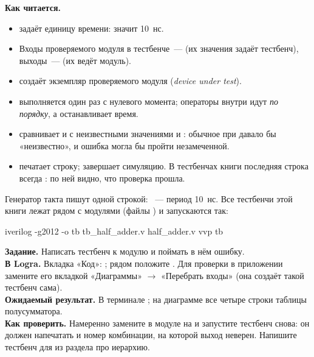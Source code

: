 \textbf{Как читается.}
\begin{itemize}
  \item {} задаёт единицу времени:  значит 10~нс.
  \item Входы проверяемого модуля в тестбенче~---  (их значения
        задаёт тестбенч), выходы~---  (их ведёт модуль).
  \item {} создаёт экземпляр проверяемого модуля
        (\emph{device under test}).
  \item {} выполняется один раз с нулевого
        момента; операторы внутри идут \emph{по порядку}, а 
        останавливает время.
  \item \code{!==} сравнивает и с неизвестными значениями  и
        : обычное \code{!=} при  давало бы «неизвестно», и
        ошибка могла бы пройти незамеченной.
  \item {} печатает строку;  завершает
        симуляцию. В тестбенчах книги последняя строка всегда
        : по ней видно, что проверка прошла.
\end{itemize}

Генератор такта пишут одной строкой: ~---
период 10~нс. Все тестбенчи этой книги лежат рядом с модулями (файлы
) и запускаются так:
\begin{vcode}[text]
iverilog -g2012 -o tb tb_half_adder.v half_adder.v
vvp tb
\end{vcode}

\begin{diybox}
\textbf{Задание.} Написать тестбенч к модулю и поймать в нём ошибку.\\
\textbf{В Logra.} Вкладка «Код»: ; рядом положите
. Для проверки в приложении замените его вкладкой
«Диаграммы» $\to$ «Перебрать входы» (она создаёт такой тестбенч сама).\\
\textbf{Ожидаемый результат.} В терминале ; на
диаграмме все четыре строки таблицы полусумматора.\\
\textbf{Как проверить.} Намеренно замените в модуле \code{\^{}} на \code{|} и
запустите тестбенч снова: он должен напечатать  и номер
комбинации, на которой выход неверен.
 Напишите тестбенч для  из раздела про иерархию.
\end{diybox}

